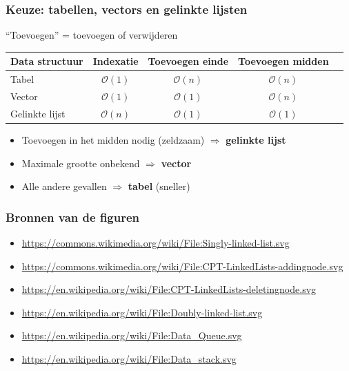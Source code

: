 \documentclass[12pt]{beamer}
\newcommand{\bigoh}[1]{\mathcal{O}\left(#1\right)}
\newcommand{\constant}{\bigoh{1}}
\newcommand{\linear}{\bigoh{n}}
\begin{document}
\begin{frame}
\frametitle{Keuze: tabellen, vectors en gelinkte lijsten}
``Toevoegen'' = toevoegen of verwijderen
\begin{center}
\begin{tabu}{l|cccc}
\toprule
Data structuur & Indexatie & Toevoegen einde & Toevoegen midden \\
\midrule
Tabel & $\constant$ & $\linear$ & $\linear$ \\
Vector& $\constant$ & $\constant$ & $\linear$ \\
Gelinkte lijst & $\linear$ & $\constant$ & $\constant$ \\
\bottomrule
\end{tabu}
\end{center}
\begin{itemize}
\item Toevoegen in het midden nodig (zeldzaam) $\Rightarrow$ \textbf{gelinkte lijst}
\item Maximale grootte onbekend $\Rightarrow$ \textbf{vector}
\item Alle andere gevallen $\Rightarrow$ \textbf{tabel} (sneller)
\end{itemize}
\end{frame}

\begin{frame}
\frametitle{Bronnen van de figuren}
\begin{itemize}
\item \url{https://commons.wikimedia.org/wiki/File:Singly-linked-list.svg}
\item \url{https://commons.wikimedia.org/wiki/File:CPT-LinkedLists-addingnode.svg}
\item \url{https://en.wikipedia.org/wiki/File:CPT-LinkedLists-deletingnode.svg}
\item \url{https://en.wikipedia.org/wiki/File:Doubly-linked-list.svg}
\item \url{https://en.wikipedia.org/wiki/File:Data_Queue.svg}
\item \url{https://en.wikipedia.org/wiki/File:Data_stack.svg}
\end{itemize}
\end{frame}
\end{document}
